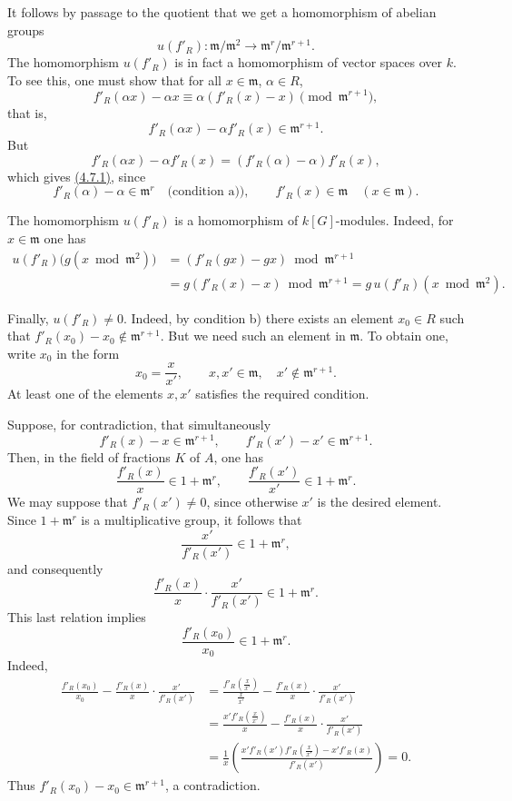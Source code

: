\documentclass[11pt]{article}
\providecommand{\fm}{\mathfrak{m}}
\providecommand{\fm}{\mathfrak m}
\begin{document}
It follows by passage to the quotient that we get a homomorphism of abelian groups
\[
u(f'_R):\fm/\fm^2\longrightarrow \fm^r/\fm^{r+1}.
\]
The homomorphism $u(f'_R)$ is in fact a homomorphism of vector spaces over $k$. To see this, one must show that for all $x\in\fm$, $\alpha\in R$,
\[
f'_R(\alpha x)-\alpha x\equiv \alpha(f'_R(x)-x)\pmod{\fm^{r+1}},
\]
that is,
\begin{equation}
\tag{4.7.1}\label{sga5:XII:equation:4.7.1}
f'_R(\alpha x)-\alpha f'_R(x)\in\fm^{r+1}.
\end{equation}
But
\[
f'_R(\alpha x)-\alpha f'_R(x)=(f'_R(\alpha)-\alpha)f'_R(x),
\]
which gives \hyperref[sga5:XII:equation:4.7.1]{(4.7.1)}, since
\[
f'_R(\alpha)-\alpha\in\fm^r\quad\text{(condition a))},
\qquad
f'_R(x)\in\fm\quad(x\in\fm).
\]

The homomorphism $u(f'_R)$ is a homomorphism of $k[G]$-modules. Indeed,
for $x\in\fm$ one has
\[
\begin{aligned}
u(f'_R)\bigl(g(x\bmod\fm^2)\bigr)
&=(f'_R(gx)-gx)\bmod\fm^{r+1}\\
&=g(f'_R(x)-x)\bmod\fm^{r+1}
=g\,u(f'_R)(x\bmod\fm^2).
\end{aligned}
\]

Finally, $u(f'_R)\ne0$. Indeed, by condition b) there exists an element
$x_0\in R$ such that $f'_R(x_0)-x_0\notin\fm^{r+1}$. But we need such an
element in $\fm$. To obtain one, write $x_0$ in the form
\[
x_0=\frac{x}{x'},\qquad x,x'\in\fm,\quad x'\notin\fm^{r+1}.
\]
At least one of the elements $x,x'$ satisfies the required condition.

Suppose, for contradiction, that simultaneously
\[
f'_R(x)-x\in\fm^{r+1},
\qquad
f'_R(x')-x'\in\fm^{r+1}.
\]
Then, in the field of fractions $K$ of $A$, one has
\[
\frac{f'_R(x)}{x}\in1+\fm^r,
\qquad
\frac{f'_R(x')}{x'}\in1+\fm^r.
\]
We may suppose that $f'_R(x')\ne0$, since otherwise $x'$ is the desired
element. Since $1+\fm^r$ is a multiplicative group, it follows that
\[
\frac{x'}{f'_R(x')}\in1+\fm^r,
\]
and consequently
\[
\frac{f'_R(x)}{x}\cdot\frac{x'}{f'_R(x')}\in1+\fm^r.
\]
This last relation implies
\[
\frac{f'_R(x_0)}{x_0}\in1+\fm^r.
\]
Indeed,
\[
\begin{aligned}
\frac{f'_R(x_0)}{x_0}
-\frac{f'_R(x)}{x}\cdot\frac{x'}{f'_R(x')}
&=\frac{f'_R(\frac{x}{x'})}{\frac{x}{x'}}
-\frac{f'_R(x)}{x}\cdot\frac{x'}{f'_R(x')}\\
&=\frac{x'f'_R(\frac{x}{x'})}{x}
-\frac{f'_R(x)}{x}\cdot\frac{x'}{f'_R(x')}\\
&=\frac1x\left(
\frac{x'f'_R(x')f'_R(\frac{x}{x'})-x'f'_R(x)}
{f'_R(x')}\right)=0.
\end{aligned}
\]
Thus $f'_R(x_0)-x_0\in\fm^{r+1}$, a contradiction.
\end{document}
